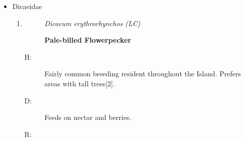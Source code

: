 \begin{itemize}
\begin{enumerate}
\begin{description}
\end{description}%
\item%
\begin{description}%
\item[]%
\textit{Clamator jacobinus (LC)}%
\item[]%
\textbf{Pied Cuckoo/Jacobin Cuckoo}%
\end{description}%
\begin{description}%
\item[H: ]%
Uncommon breeding resident from lowlands to mid hills. A winter migrant population also exist{[}2{]}.%
\item[D: ]%
 Feeds on various insects, especially favoring hairy caterpillars. Also known for consuming fruits%
\item[R: ]%
Single sighting at Boat Yard.%
\end{description}%
\item%
\begin{description}%
\item[]%
\textit{Hierococcyx varius (VU)}%
\item[]%
\textbf{Common Hawk-Cuckoo}%
\end{description}%
\begin{description}%
\item[H: ]%
Uncommon breeding resident with a rare migrant population. Has become more regular on lowlands in the recent past. Highly arboreal{[}2{]}.%
\item[D: ]%
Insectivores with special preference for catepillars.%
\item[R: ]%
Near L Canteen,around Sumanadasa building, and inside Kaju Kele.%
\end{description}%
\end{enumerate}%
\item%
Dicaeidae%
\begin{enumerate}%
\item%
\begin{description}%
\item[]%
\textit{Dicaeum erythrorhynchos (LC)}%
\item[]%
\textbf{Pale{-}billed Flowerpecker}%
\end{description}%
\begin{description}%
\item[H: ]%
Fairly common breeding resident throughout the Island. Prefers areas with tall trees{[}2{]}.%
\item[D: ]%
Feeds on nectar and berries.%
\item[R: ]%

\end{description}
\end{enumerate}
\end{itemize}
